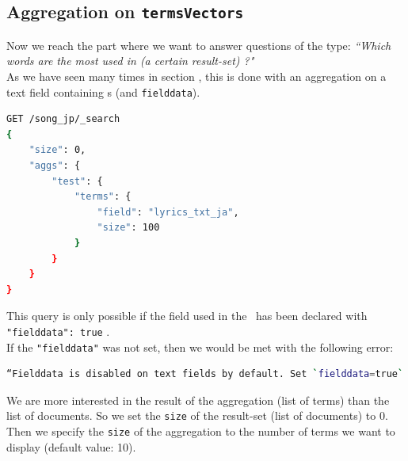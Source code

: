 \bigskip
\bigskip
\bigskip



\subsection{Aggregation on \texttt{termsVectors}} \label{aggregation-termsVectors}

Now we reach the part where we want to answer questions of the type: \emph{``Which words are the most used in (a certain result-set) ?"} \\

As we have seen many times in section \emph{}, this is done with an aggregation on a text field containing \termsVector s (and \texttt{fielddata}). \\

\begin{lstlisting}[language=sh]
GET /song_jp/_search
{
	"size": 0,
	"aggs": {
		"test": {
			"terms": {
				"field": "lyrics_txt_ja",
				"size": 100
			}
		}
	}
}
\end{lstlisting}

This query is only possible if the field used in the \faceting\ has been declared with \texttt{"fielddata": true} . \\

If the \texttt{"fielddata"} was not set, then we would be met with the following error:

\begin{lstlisting}[language=sh]
“Fielddata is disabled on text fields by default. Set `fielddata=true` on [`your_field_name`] in order to load field data in memory by uninverting the inverted index. Note that this can however, use “significant memory.” – if this happens you can either enable the field-data on that text field, or choose another way to query the data (again, because field-data consumes a lot of memory and is not recommended).
\end{lstlisting}

\bigskip
\bigskip

We are more interested in the result of the aggregation (list of terms) than the list of documents. So we set the \texttt{size} of the result-set (list of documents) to 0. \\

Then we specify the \texttt{size} of the aggregation to the number of terms we want to display (default value: 10). \\


